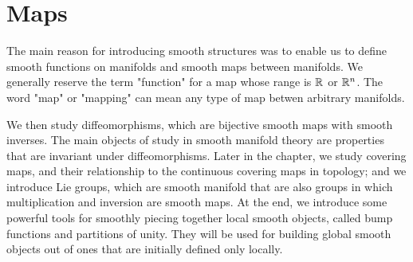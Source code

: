 \chapter{Maps}
The main reason for introducing smooth structures was to enable us to define
smooth functions on manifolds and smooth maps between manifolds. We generally
reserve the term "function" for a map whose range is $\mathbb{R}$ or $\mathbb{R}^n$. The word
"map" or "mapping" can mean any type of map betwen arbitrary manifolds. 

We then study diffeomorphisms, which are bijective smooth maps with smooth inverses.
The main objects of study in smooth manifold theory are properties that are 
invariant under diffeomorphisms. Later in the chapter, we study covering maps, and
their relationship to the continuous covering maps in topology; and we introduce
Lie groups, which are smooth manifold that are also groups in which multiplication
and inversion are smooth maps. At the end, we introduce some powerful tools for
smoothly piecing together local smooth objects, called bump functions and partitions
of unity. They will be used for building global smooth objects out of ones that 
are initially defined only locally.

